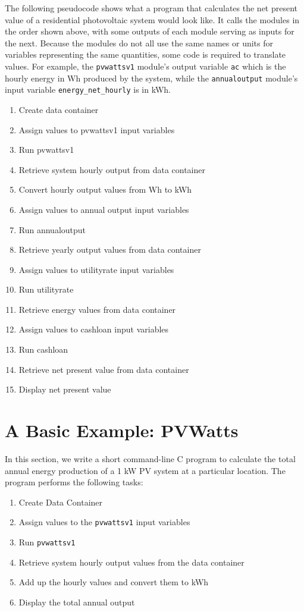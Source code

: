 \documentclass{article}
\begin{document}
The following pseudocode shows what a program that calculates the net present value of a residential photovoltaic system would look like. It calls the modules in the order shown above, with some outputs of each module serving as inputs for the next. Because the modules do not all use the same names or units for variables representing the same quantities, some code is required to translate values. For example, the \texttt{pvwattsv1} module's output variable \texttt{ac} which is the hourly energy in Wh produced by the system, while the \texttt{annualoutput} module's input variable \texttt{energy\_net\_hourly} is in kWh.

\begin{enumerate}
\item Create data container
\item Assign values to pvwattsv1 input variables
\item Run pvwattsv1
\item Retrieve system hourly output from data container
\item Convert hourly output values from Wh to kWh
\item Assign values to annual output input variables
\item Run annualoutput
\item Retrieve yearly output values from data container
\item Assign values to utilityrate input variables
\item Run utilityrate
\item Retrieve energy values from data container
\item Assign values to cashloan input variables
\item Run cashloan
\item Retrieve net present value from data container
\item Display net present value
\end{enumerate}

\section{A Basic Example: PVWatts}
\label{sec_pvwatts_example}

In this section, we write a short command-line C program to calculate the total annual energy production of a 1 kW PV system at a particular location. The program performs the following tasks:

\begin{enumerate}
\item Create Data Container
\item Assign values to the \texttt{pvwattsv1} input variables
\item Run \texttt{pvwattsv1}
\item Retrieve system hourly output values from the data container
\item Add up the hourly values and convert them to kWh
\item Display the total annual output
\end{enumerate}
\end{document}

